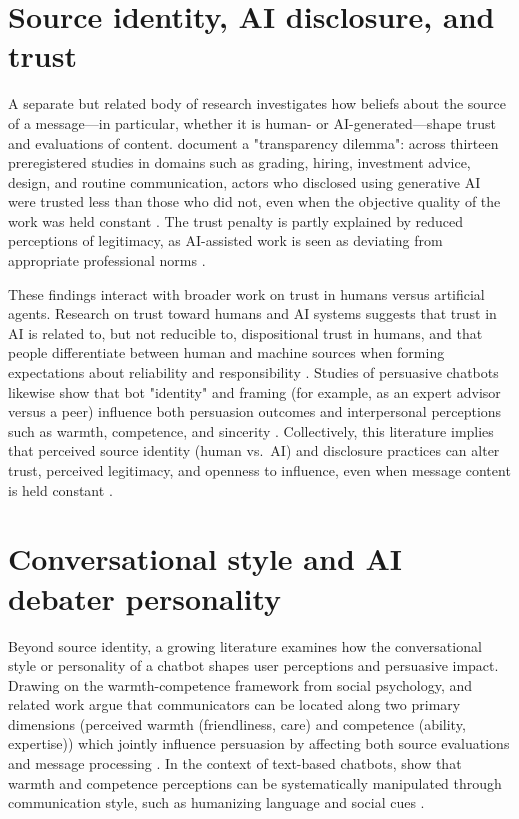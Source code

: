 \section{Source identity, AI disclosure, and trust}

A separate but related body of research investigates how beliefs about the source of a
message---in particular, whether it is human- or AI-generated---shape trust and evaluations of
content. \textcite{schilke2025_transparency_dilemma} document a "transparency dilemma": across
thirteen preregistered studies in domains such as grading, hiring, investment advice, design,
and routine communication, actors who disclosed using generative AI were trusted less than those
who did not, even when the objective quality of the work was held constant
\cite{schilke2025_transparency_dilemma}. The trust penalty is partly explained by reduced
perceptions of legitimacy, as AI-assisted work is seen as deviating from appropriate
professional norms \cite{schilke2025_transparency_dilemma}.

These findings interact with broader work on trust in humans versus artificial agents.
Research on trust toward humans and AI systems suggests that trust in AI is related to, but not
reducible to, dispositional trust in humans, and that people differentiate between human and
machine sources when forming expectations about reliability and responsibility
\cite{montag2023_trust_humans_vs_ai}. Studies of persuasive chatbots likewise show that bot
"identity" and framing (for example, as an expert advisor versus a peer) influence both
persuasion outcomes and interpersonal perceptions such as warmth, competence, and sincerity
\cite{shi2020_effects_persuasive_dialogues_bots}. Collectively, this literature implies that
perceived source identity (human vs.\ AI) and disclosure practices can alter trust, perceived
legitimacy, and openness to influence, even when message content is held constant
\cite{schilke2025_transparency_dilemma,montag2023_trust_humans_vs_ai,shi2020_effects_persuasive_dialogues_bots}.

\section{Conversational style and AI debater personality}

Beyond source identity, a growing literature examines how the conversational style or personality
of a chatbot shapes user perceptions and persuasive impact. Drawing on the warmth-competence
framework from social psychology, \textcite{deng2022_ambivalent_stereotypes_persuasion} and
related work argue that communicators can be located along two primary dimensions (perceived
warmth (friendliness, care) and competence (ability, expertise)) which jointly influence persuasion
by affecting both source evaluations and message processing
\cite{deng2022_ambivalent_stereotypes_persuasion}. In the context of text-based chatbots,
\textcite{schwede2023_can_chatbots_be_persuasive} show that warmth and competence perceptions can
be systematically manipulated through communication style, such as humanizing language and social
cues \cite{schwede2023_can_chatbots_be_persuasive}.


